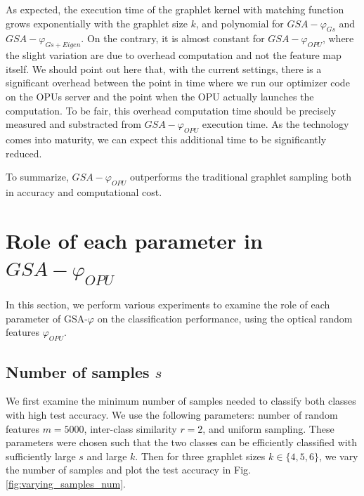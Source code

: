 As expected, the execution time of the graphlet kernel with matching function grows exponentially with the graphlet size $k$, and polynomial for $GSA-\varphi_{Gs}$ and $GSA-\varphi_{Gs+Eigen}$. On the contrary, it is almost constant for $GSA-\varphi_{OPU}$, where the slight variation are due to overhead computation and not the feature map itself. We should point out here that, with the current settings, there is a significant overhead between the point in time where we run our optimizer code on the OPUs server and the point when the OPU actually launches the computation. To be fair, this overhead computation time should be precisely measured and substracted from $GSA-\varphi_{OPU}$ execution time. As the technology comes into maturity, we can expect this additional time to be significantly reduced. 

To summarize, $GSA-\varphi_{OPU}$ outperforms the traditional graphlet sampling both in accuracy and computational cost.

\section{Role of each parameter in $GSA-\varphi_{OPU}$}

In this section, we perform various experiments to examine the role of each parameter of GSA-$\varphi$ on the classification performance, using the optical random features $\varphi_{OPU}$.

\subsection{Number of samples $s$}
We first examine the minimum number of samples needed to classify both classes with high test accuracy.%
%
We use the following parameters: number of random features $m=5000$, inter-class similarity $r=2$, and uniform sampling. These parameters were chosen such that the two classes can be efficiently classified with sufficiently large $s$ and large $k$. Then for three graphlet sizes $k\in\{4,5,6\}$, we vary the number of samples and plot the test accuracy in Fig. \ref{fig:varying_samples_num}.


